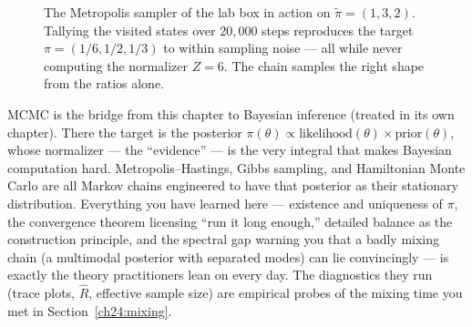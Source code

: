 \begin{figure}[H]
  \centering
  \caption{The Metropolis sampler of the lab box in action on
  $\tilde\pi=(1,3,2)$. Tallying the visited states over $20{,}000$ steps
  reproduces the target $\pi=(1/6,1/2,1/3)$ to within sampling noise --- all
  while never computing the normalizer $Z=6$. The chain samples the right shape
  from the ratios alone.}
  \label{ch24:fig-mcmc-hist}
\end{figure}

\begin{connectionbox}
MCMC is the bridge from this chapter to Bayesian inference (treated in its own
chapter). There the target is the posterior
$\pi(\theta) \propto \text{likelihood}(\theta)\times \text{prior}(\theta)$, whose
normalizer --- the ``evidence'' --- is the very integral that makes Bayesian
computation hard. Metropolis--Hastings, Gibbs sampling, and Hamiltonian Monte
Carlo are all Markov chains engineered to have that posterior as their stationary
distribution. Everything you have learned here --- existence and uniqueness of
$\pi$, the convergence theorem licensing ``run it long enough,'' detailed balance
as the construction principle, and the spectral gap warning you that a badly
mixing chain (a multimodal posterior with separated modes) can lie convincingly
--- is exactly the theory practitioners lean on every day. The diagnostics they
run (trace plots, $\hat R$, effective sample size) are empirical probes of the
mixing time you met in Section~\ref{ch24:mixing}.
\end{connectionbox}

